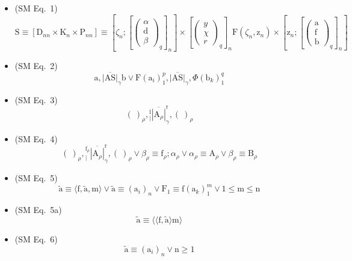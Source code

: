 \documentclass[
    12pt,              %
    a4paper,           %
    headings=normal,   %
    twoside=true,      %
    BCOR=8mm,          %
]{scrbook}
\begin{document}
\begin{itemize}[label={},leftmargin=0pt]
    \item (SM Eq.\ 1) 
    \[
    \mathrm{S} \equiv [\mathrm{D}_{nn} \times \mathrm{K}_n \times \mathrm{P}_{nn}] \equiv \left[ \zeta_n; \left[ \begin{pmatrix} \alpha \\ \mathrm{d} \\ \beta \end{pmatrix}_q \right]_n \right] \times \left[ \begin{pmatrix} y \\ \chi \\ r \end{pmatrix}_q \right]_n \mathrm{F}(\zeta_n, \mathrm{z}_n) \times \left[ \mathrm{z}_n; \left[ \begin{pmatrix} \mathrm{a} \\ \mathrm{f} \\ \mathrm{b} \end{pmatrix}_q \right]_n \right]
    \]

    \item (SM Eq.\ 2) 
    \[
    \mathrm{a}, \overline{|\mathrm{AS}|}_\gamma \mathrm{b} \lor \mathrm{F}(\mathrm{a}_i)_1^p, \overline{|\mathrm{AS}|}_\gamma, \Phi(\mathrm{b}_k)_1^q
    \]

    \item (SM Eq.\ 3) 
    \[
    (\ )_\rho, \left. {}^{\mathrm{l}}_{|} \overline{|\mathrm{A}_\rho|} \right.^{\mathrm{r}}_\gamma, (\ )_\rho
    \]

    \item (SM Eq.\ 4) 
    \[
    (\ )_\rho, \left. {}^{\mathrm{f}_\rho}_{|} \overline{|\mathrm{A}_\rho|} \right.^{\mathrm{r}}_\gamma, (\ )_\rho \lor \beta_\rho \equiv \mathrm{f}_\rho; \alpha_\rho \lor \alpha_\rho \equiv \mathrm{A}_\rho \lor \beta_\rho \equiv \mathrm{B}_\rho
    \]

    \item (SM Eq.\ 5) 
    \[
    \tilde{\mathrm{a}} \equiv \langle \mathrm{f}, \tilde{\mathrm{a}}, \mathrm{m} \rangle \lor \tilde{\mathrm{a}} \equiv (\mathrm{a}_i)_n \lor \mathrm{F}_1 \equiv \mathrm{f}(\mathrm{a}_k)_1^m \lor 1 \le \mathrm{m} \le \mathrm{n}
    \]

    \item (SM Eq.\ 5a) 
    \[
    \tilde{\mathrm{a}} \equiv \langle\langle \mathrm{f}, \tilde{\mathrm{a}} \rangle \mathrm{m} \rangle
    \]

    \item (SM Eq.\ 6) 
    \[
    \tilde{\mathrm{a}} \equiv (\mathrm{a}_i)_n \lor \mathrm{n} \ge 1
    \]


\end{itemize}
\end{document}
